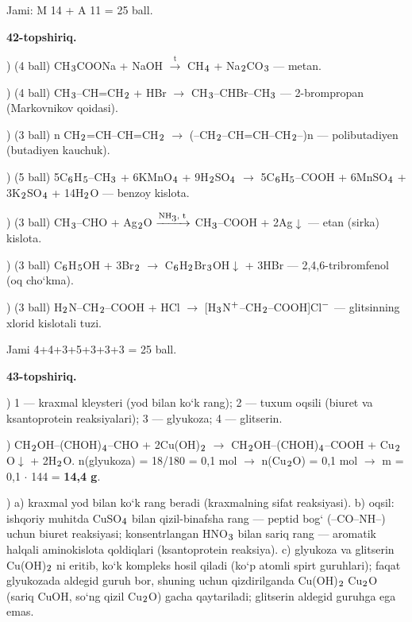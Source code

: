 \documentclass[11pt,a4paper]{article}
\renewcommand{\textsubscript}[1]{\ensuremath{_{\text{\fontsize{8}{8}\selectfont #1}}}}
\renewcommand{\textsuperscript}[1]{\ensuremath{^{\text{\fontsize{8}{8}\selectfont #1}}}}
\begin{document}
\noindent Jami: M 14 + A 11 = 25 ball.\par
\noindent\textbf{42-topshiriq.}\par
{}) (4 ball) CH\textsubscript{3}COONa + NaOH $\xrightarrow{\text{t}}$ CH\textsubscript{4} + Na\textsubscript{2}CO\textsubscript{3} --- metan.\par
{}) (4 ball) CH\textsubscript{3}--CH=CH\textsubscript{2} + HBr $\to$ CH\textsubscript{3}--CHBr--CH\textsubscript{3} --- 2-brompropan (Markovnikov qoidasi).\par
{}) (3 ball) n CH\textsubscript{2}=CH--CH=CH\textsubscript{2} $\to$ (--CH\textsubscript{2}--CH=CH--CH\textsubscript{2}--)n --- polibutadiyen (butadiyen kauchuk).\par
{}) (5 ball) 5C\textsubscript{6}H\textsubscript{5}--CH\textsubscript{3} + 6KMnO\textsubscript{4} + 9H\textsubscript{2}SO\textsubscript{4} $\to$ 5C\textsubscript{6}H\textsubscript{5}--COOH + 6MnSO\textsubscript{4} + 3K\textsubscript{2}SO\textsubscript{4} + 14H\textsubscript{2}O --- benzoy kislota.\par
{}) (3 ball) CH\textsubscript{3}--CHO + Ag\textsubscript{2}O $\xrightarrow{\text{NH\textsubscript{3}, t}}$ CH\textsubscript{3}--COOH + 2Ag$\downarrow$ --- etan (sirka) kislota.\par
{}) (3 ball) C\textsubscript{6}H\textsubscript{5}OH + 3Br\textsubscript{2} $\to$ C\textsubscript{6}H\textsubscript{2}Br\textsubscript{3}OH$\downarrow$ + 3HBr --- 2,4,6-tribromfenol (oq cho`kma).\par
{}) (3 ball) H\textsubscript{2}N--CH\textsubscript{2}--COOH + HCl $\to$ [H\textsubscript{3}N\textsuperscript{+}--CH\textsubscript{2}--COOH]Cl\textsuperscript{$-$} --- glitsinning xlorid kislotali tuzi.\par
\noindent Jami 4+4+3+5+3+3+3 = 25 ball.\par
\noindent\textbf{43-topshiriq.}\par
{}) 1 --- kraxmal kleysteri (yod bilan ko`k rang); 2 --- tuxum oqsili (biuret va ksantoprotein reaksiyalari); 3 --- glyukoza; 4 --- glitserin.\par
{}) CH\textsubscript{2}OH--(CHOH)\textsubscript{4}--CHO + 2Cu(OH)\textsubscript{2} $\to$ CH\textsubscript{2}OH--(CHOH)\textsubscript{4}--COOH + Cu\textsubscript{2}O$\downarrow$ + 2H\textsubscript{2}O. n(glyukoza) = 18/180 = 0,1 mol $\to$ n(Cu\textsubscript{2}O) = 0,1 mol $\to$ m = 0,1 $\cdot$ 144 = \textbf{14,4 g}.\par
{}) a) kraxmal yod bilan ko`k rang beradi (kraxmalning sifat reaksiyasi). b) oqsil: ishqoriy muhitda CuSO\textsubscript{4} bilan qizil-binafsha rang --- peptid bog` (--CO--NH--) uchun biuret reaksiyasi; konsentrlangan HNO\textsubscript{3} bilan sariq rang --- aromatik halqali aminokislota qoldiqlari (ksantoprotein reaksiya). c) glyukoza va glitserin Cu(OH)\textsubscript{2} ni eritib, ko`k kompleks hosil qiladi (ko`p atomli spirt guruhlari); faqat glyukozada aldegid guruh bor, shuning uchun qizdirilganda Cu(OH)\textsubscript{2} Cu\textsubscript{2}O (sariq CuOH, so`ng qizil Cu\textsubscript{2}O) gacha qaytariladi; glitserin aldegid guruhga ega emas.\par
\end{document}
